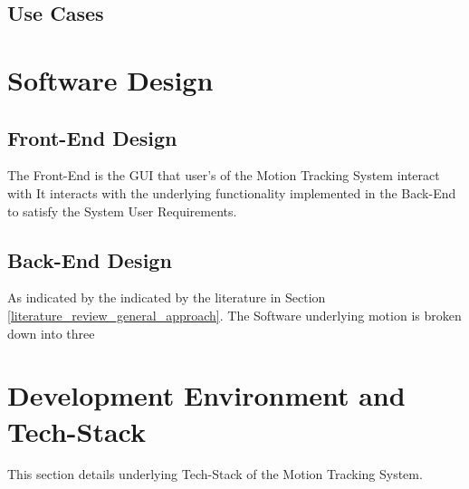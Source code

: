 \subsection{Use Cases}



\section{Software Design}


\subsection{Front-End Design}
The Front-End is the GUI that user's of the Motion Tracking System interact with 
It interacts with the underlying functionality implemented in the Back-End to
satisfy the System User Requirements. 


\subsection{Back-End Design}
As indicated by the indicated by the literature in Section
\ref{literature_review_general_approach}. The Software underlying motion is broken down into three

\section{Development Environment and Tech-Stack}
This section details underlying Tech-Stack of the Motion Tracking System.



